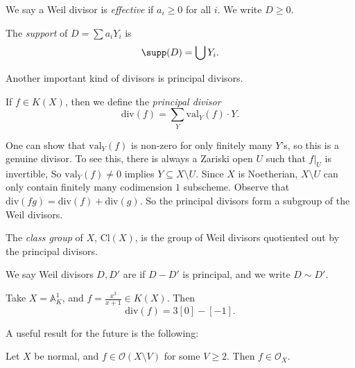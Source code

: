 \documentclass[a4paper]{article}
\newcommand\A{\mathbb{A}}
\newcommand\val{\mathrm{val}}
\renewcommand\div{\mathrm{div}}
\newcommand\Cl{\mathrm{Cl}}
\begin{document}
\begin{defi}
  We say a Weil divisor is \emph{effective} if $a_i \geq 0$ for all $i$. We write $D \geq 0$.
\end{defi}

\begin{defi}[Support]
  The \emph{support} of $D = \sum a_i Y_i$ is
  \[
    \supp(D) = \bigcup Y_i.
  \]
\end{defi}
Another important kind of divisors is principal divisors.

\begin{defi}
  If $f \in K(X)$, then we define the \emph{principal divisor}
  \[
    \div(f) = \sum_{Y} \val_Y(f) \cdot Y.
  \]
\end{defi}
One can show that $\val_Y(f)$ is non-zero for only finitely many $Y$'s, so this is a genuine divisor. To see this, there is always a Zariski open $U$ such that $f|_U$ is invertible, So $\val_Y(f) \not= 0$ implies $Y \subseteq X \setminus U$. Since $X$ is Noetherian, $X \setminus U$ can only contain finitely many codimension $1$ subscheme.
Observe that $\div(fg) = \div(f) + \div(g)$. So the principal divisors form a subgroup of the Weil divisors.

\begin{defi}
  The \emph{class group} of $X$, $\Cl(X)$, is the group of Weil divisors quotiented out by the principal divisors.

  We say Weil divisors $D, D'$ are  if $D - D'$ is principal, and we write $D \sim D'$.
\end{defi}

\begin{eg}
  Take $X = \A^1_K$, and $f = \frac{x^3}{x + 1} \in K(X)$. Then
  \[
    \div(f) = 3[0] - [-1].
  \]
\end{eg}

A useful result for the future is the following:
\begin{thm}
  Let $X$ be normal, and $f \in \mathcal{O}(X \setminus V)$ for some $V \geq 2$. Then $f \in \mathcal{O}_X$.
\end{thm}
\end{document}
